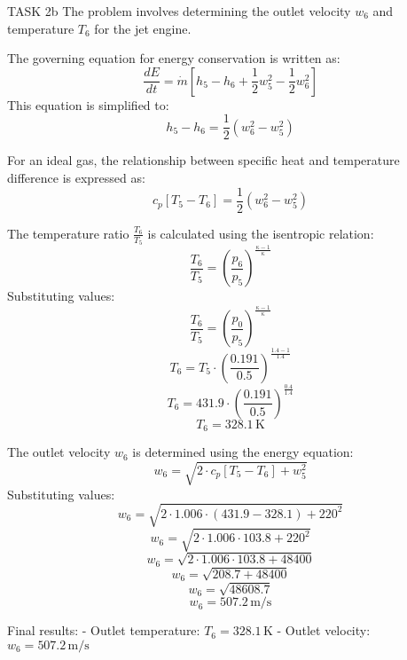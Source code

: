 TASK 2b  
The problem involves determining the outlet velocity \( w_6 \) and temperature \( T_6 \) for the jet engine.  

The governing equation for energy conservation is written as:  
\[
\frac{dE}{dt} = \dot{m} \left[ h_5 - h_6 + \frac{1}{2} w_5^2 - \frac{1}{2} w_6^2 \right]
\]  
This equation is simplified to:  
\[
h_5 - h_6 = \frac{1}{2} \left( w_6^2 - w_5^2 \right)
\]  

For an ideal gas, the relationship between specific heat and temperature difference is expressed as:  
\[
c_p \left[ T_5 - T_6 \right] = \frac{1}{2} \left( w_6^2 - w_5^2 \right)
\]  

The temperature ratio \( \frac{T_6}{T_5} \) is calculated using the isentropic relation:  
\[
\frac{T_6}{T_5} = \left( \frac{p_6}{p_5} \right)^{\frac{\kappa - 1}{\kappa}}
\]  
Substituting values:  
\[
\frac{T_6}{T_5} = \left( \frac{p_0}{p_5} \right)^{\frac{\kappa - 1}{\kappa}}
\]  
\[
T_6 = T_5 \cdot \left( \frac{0.191}{0.5} \right)^{\frac{1.4 - 1}{1.4}}
\]  
\[
T_6 = 431.9 \cdot \left( \frac{0.191}{0.5} \right)^{\frac{0.4}{1.4}}
\]  
\[
T_6 = 328.1 \, \text{K}
\]  

The outlet velocity \( w_6 \) is determined using the energy equation:  
\[
w_6 = \sqrt{2 \cdot c_p \left[ T_5 - T_6 \right] + w_5^2}
\]  
Substituting values:  
\[
w_6 = \sqrt{2 \cdot 1.006 \cdot \left( 431.9 - 328.1 \right) + 220^2}
\]  
\[
w_6 = \sqrt{2 \cdot 1.006 \cdot 103.8 + 220^2}
\]  
\[
w_6 = \sqrt{2 \cdot 1.006 \cdot 103.8 + 48400}
\]  
\[
w_6 = \sqrt{208.7 + 48400}
\]  
\[
w_6 = \sqrt{48608.7}
\]  
\[
w_6 = 507.2 \, \text{m/s}
\]  

Final results:  
- Outlet temperature: \( T_6 = 328.1 \, \text{K} \)  
- Outlet velocity: \( w_6 = 507.2 \, \text{m/s} \)